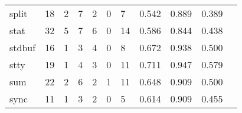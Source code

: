 \begin{longtable}{lp{1.2cm}p{1.2cm}p{1.2cm}p{1.2cm}p{1.2cm}p{1.2cm}p{1.2cm}p{1.2cm}p{1.2cm}p{1.2cm}}
split     &                                    18 &                                                  2 &                                                  7 &                                                  2 &                                                  0 &                                                  7 &                                              0.542 &                                              0.889 &                                              0.389 \\
stat      &                                    32 &                                                  5 &                                                  7 &                                                  6 &                                                  0 &                                                 14 &                                              0.586 &                                              0.844 &                                              0.438 \\
stdbuf    &                                    16 &                                                  1 &                                                  3 &                                                  4 &                                                  0 &                                                  8 &                                              0.672 &                                              0.938 &                                              0.500 \\
stty      &                                    19 &                                                  1 &                                                  4 &                                                  3 &                                                  0 &                                                 11 &                                              0.711 &                                              0.947 &                                              0.579 \\
sum       &                                    22 &                                                  2 &                                                  6 &                                                  2 &                                                  1 &                                                 11 &                                              0.648 &                                              0.909 &                                              0.500 \\
sync      &                                    11 &                                                  1 &                                                  3 &                                                  2 &                                                  0 &                                                  5 &                                              0.614 &                                              0.909 &                                              0.455 \\

\end{longtable}
